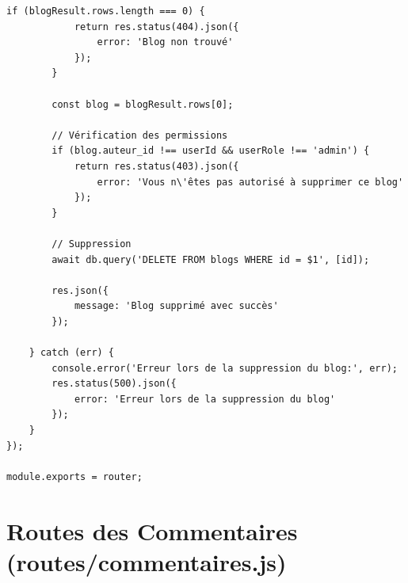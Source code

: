 \begin{lstlisting}[style=javascript, caption=routes/blogs.js - Routes des blogs complètes]
        if (blogResult.rows.length === 0) {
            return res.status(404).json({ 
                error: 'Blog non trouvé' 
            });
        }
        
        const blog = blogResult.rows[0];
        
        // Vérification des permissions
        if (blog.auteur_id !== userId && userRole !== 'admin') {
            return res.status(403).json({ 
                error: 'Vous n\'êtes pas autorisé à supprimer ce blog' 
            });
        }
        
        // Suppression
        await db.query('DELETE FROM blogs WHERE id = $1', [id]);
        
        res.json({ 
            message: 'Blog supprimé avec succès' 
        });
        
    } catch (err) {
        console.error('Erreur lors de la suppression du blog:', err);
        res.status(500).json({ 
            error: 'Erreur lors de la suppression du blog' 
        });
    }
});

module.exports = router;
\end{lstlisting}

\section{Routes des Commentaires (routes/commentaires.js)}

